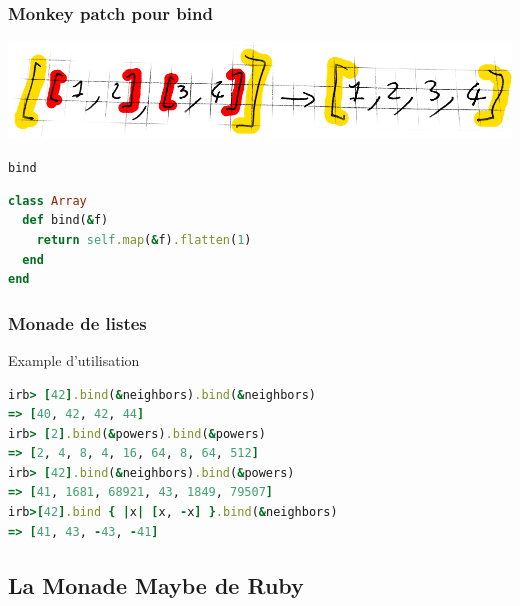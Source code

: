 \documentclass{beamer}
\begin{document}
\begin{frame}[fragile]
  \frametitle{Monkey patch pour bind}
  \begin{center}
    \includegraphics[scale=0.2]{flatten}
  \end{center}
  \begin{block}{\verb!bind!}\begin{lstlisting}[language=ruby]
class Array
  def bind(&f)
    return self.map(&f).flatten(1)
  end
end
    \end{lstlisting}  
  \end{block}
\end{frame}

\begin{frame}[fragile]
  \frametitle{Monade de listes}
  \begin{exampleblock}{Example d'utilisation}
    \begin{lstlisting}[language=ruby]
irb> [42].bind(&neighbors).bind(&neighbors)
=> [40, 42, 42, 44]
irb> [2].bind(&powers).bind(&powers)
=> [2, 4, 8, 4, 16, 64, 8, 64, 512]
irb> [42].bind(&neighbors).bind(&powers)
=> [41, 1681, 68921, 43, 1849, 79507]
irb>[42].bind { |x| [x, -x] }.bind(&neighbors)
=> [41, 43, -43, -41]
    \end{lstlisting}
  \end{exampleblock}
\end{frame}

\subsection{La Monade Maybe de Ruby}
\end{document}
